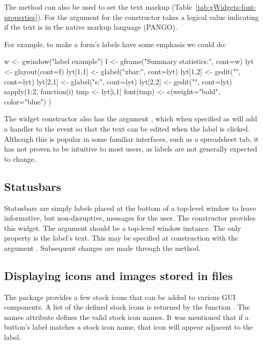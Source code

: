 The  method
can also be used to set the text markup
(Table~\ref{tab:gWidgets-font-properties}).  For  the
argument  for the constructor takes a logical
value indicating if the text is in the native markup language (PANGO).


For example, to make a form's labels have some emphasis we could do:
\begin{Schunk}
\begin{Sinput}
 w <- gwindow("label example")
 f <- gframe("Summary statistics:", cont=w)
 lyt <- glayout(cont=f)
 lyt[1,1] <- glabel("xbar:", cont=lyt)
 lyt[1,2] <- gedit("", cont=lyt)
 lyt[2,1] <- glabel("s:", cont=lyt)
 lyt[2,2] <- gedit("", cont=lyt)
 sapply(1:2, function(i) {
   tmp <- lyt[i,1]
   font(tmp) <- c(weight="bold", color="blue")
 })
\end{Sinput}
\end{Schunk}


The widget constructor also has the argument
, which when specified as  will
add a handler to the event so that the text can be edited when the
label is clicked.  Although this is popular in some familiar
interfaces, such as a spreadsheet tab, it has not proven to be
intuitive to most users, as labels are not generally expected to change.


\subsection{Statusbars}
\label{sec:gWidgets-statusbars}

Statusbars are simply labels placed at the bottom of a top-level window to leave
informative, but non-disruptive, messages for the user.  The
 constructor provides this widget.  The
 argument should be a top-level window instance. 
The only property is the label's text. This may be specified at
construction with the argument
. Subsequent changes are made through
the  method. 




\subsection{Displaying icons and images stored in files}
\label{sec:gWidgets-displ-icons-imag}

The  package provides a few stock icons that can be
added to various GUI components. A list of the defined stock icons is
returned by the function .  The names attribute
defines the valid stock icon names. It was mentioned that if a
button's label matches a stock icon name, that icon will appear
adjacent to the label.




